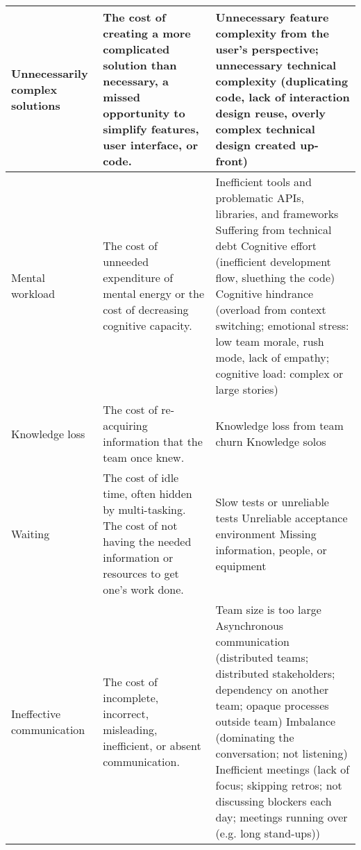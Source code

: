 \begin{table*}[t]
\begin{tabular}{|p{1.7in}|p{1.9in}|p{3in}|}
Unnecessarily complex solutions  & The cost of creating a more complicated solution than necessary,  a missed opportunity to simplify features, user interface, or code.      & 
Unnecessary feature complexity from the user's perspective; unnecessary technical complexity (duplicating code, lack of interaction design reuse, overly complex technical design created up-front)
\\ \hline
Mental workload  &   The cost of unneeded expenditure of mental energy or the cost of decreasing cognitive capacity.   & 
Inefficient tools and problematic APIs, libraries, and frameworks \newline
Suffering from technical debt \newline						
Cognitive effort (inefficient development flow, sluething the code) \newline
Cognitive hindrance (overload from context switching; emotional stress: low team morale, rush mode, lack of empathy; cognitive load: complex or large stories)
\\ \hline
Knowledge loss & The cost of re-acquiring information that the team once knew. & 
Knowledge loss from team churn \newline
Knowledge solos 
\\ \hline
Waiting                               & The cost of idle time, often hidden by multi-tasking. The cost of not having the needed information or resources to get one's work done. & 
Slow tests or unreliable tests \newline Unreliable acceptance environment \newline Missing information, people, or equipment                                                                                                                                                                                                                                                                            \\ \hline
Ineffective communication             & The cost of incomplete, incorrect, misleading, inefficient, or absent communication.                         & 
Team size is too large \newline Asynchronous communication (distributed teams; distributed stakeholders; dependency on another team; opaque processes outside team) \newline Imbalance (dominating the conversation; not listening) \newline Inefficient meetings (lack of focus; skipping retros; not discussing blockers each day; meetings running over (e.g. long stand-ups)) \\ \hline                  
\end{tabular}
\end{table*}




